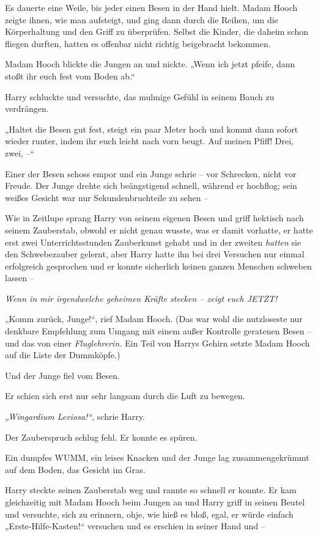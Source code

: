{Es dauerte eine Weile, bis jeder einen Besen in der Hand hielt. Madam Hooch zeigte ihnen, wie man aufsteigt, und ging dann durch die Reihen, um die Körperhaltung und den Griff zu überprüfen. Selbst die Kinder, die daheim schon fliegen durften, hatten es offenbar nicht richtig beigebracht bekommen.

Madam Hooch blickte die Jungen an und nickte. „Wenn ich jetzt pfeife, dann stoßt ihr euch fest vom Boden ab.“

Harry schluckte und versuchte, das mulmige Gefühl in seinem Bauch zu verdrängen.

„Haltet die Besen gut fest, steigt ein paar Meter hoch und kommt dann sofort wieder runter, indem ihr euch leicht nach vorn beugt. Auf meinen Pfiff! Drei, zwei, --“

Einer der Besen schoss empor und ein Junge schrie -- vor Schrecken, nicht vor Freude. Der Junge drehte sich beängstigend schnell, während er hochflog; sein weißes Gesicht war nur Sekundenbruchteile zu sehen --

Wie in Zeitlupe sprang Harry von seinem eigenen Besen und griff hektisch nach seinem Zauberstab, obwohl er nicht genau wusste, was er damit vorhatte, er hatte erst zwei Unterrichtsstunden Zauberkunst gehabt und in der zweiten \emph{hatten} sie den Schwebezauber gelernt, aber Harry hatte ihn bei drei Versuchen nur einmal erfolgreich gesprochen und er konnte sicherlich keinen ganzen Menschen schweben lassen --

\emph{Wenn in mir irgendwelche geheimen Kräfte stecken -- zeigt euch JETZT!}

„Komm zurück, Junge!“, rief Madam Hooch. (Das war wohl die nutzloseste nur denkbare Empfehlung zum Umgang mit einem außer Kontrolle geratenen Besen -- und das von einer \emph{Fluglehrerin.} Ein Teil von Harrys Gehirn setzte Madam Hooch auf die Liste der Dummköpfe.)

Und der Junge fiel vom Besen.

Er schien sich erst nur sehr langsam durch die Luft zu bewegen.

\emph{„Wingardium Leviosa!“}, schrie Harry.

Der Zauberspruch schlug fehl. Er konnte es spüren.

Ein dumpfes WUMM, ein leises Knacken und der Junge lag zusammengekrümmt auf dem Boden, das Gesicht im Gras.

Harry steckte seinen Zauberstab weg und rannte so schnell er konnte. Er kam gleichzeitig mit Madam Hooch beim Jungen an und Harry griff in seinen Beutel und versuchte, sich zu erinnern, ohje, wie hieß es bloß, egal, er würde einfach „Erste-Hilfe-Kasten!“ versuchen und es erschien in seiner Hand und --

}
